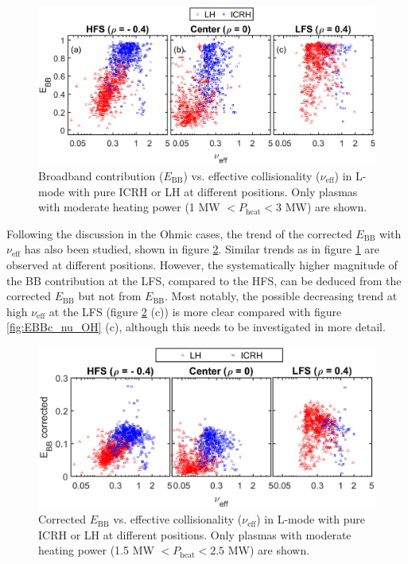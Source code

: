 \begin{figure}[h]
\begin{centering}
\includegraphics[scale=0.7]{fig_EBB_nu_Lmode.eps}
\par\end{centering}
\caption{Broadband contribution ($E_\mathrm{BB}$) vs. effective collisionality ($\nu_\mathrm{eff}$) in L-mode with pure ICRH or LH at different positions. Only plasmas with moderate heating power (1 MW $<P_\mathrm{heat}< 3$ MW) are shown.}
\label{fig:EBB_nu_Lmode}
\end{figure}


Following the discussion in the Ohmic cases, the trend of the corrected $E_\mathrm{BB}$ with $\nu_\mathrm{eff}$ has also been studied, shown in figure \ref{fig:EBBc_nu_Lmode}. Similar trends as in figure \ref{fig:EBB_nu_Lmode} are observed at different positions. However, the systematically higher magnitude of the BB contribution at the LFS, compared to the HFS, can be deduced from the corrected $E_\mathrm{BB}$ but not from $E_\mathrm{BB}$. Most notably, the possible decreasing trend at high $\nu_\mathrm{eff}$ at the LFS (figure \ref{fig:EBBc_nu_Lmode} (c)) is more clear compared with figure \ref{fig:EBBc_nu_OH} (c), although this needs to be investigated in more detail.


\begin{figure}[h]
\begin{centering}
\includegraphics[scale=0.72]{fig_EBBc_nu_Lmode.eps}
\par\end{centering}
\caption{Corrected $E_\mathrm{BB}$ vs. effective collisionality ($\nu_\mathrm{eff}$) in L-mode with pure ICRH or LH at different positions. Only plasmas with moderate heating power (1.5 MW $<P_\mathrm{heat}< 2.5$ MW) are shown.}
\label{fig:EBBc_nu_Lmode}
\end{figure}


